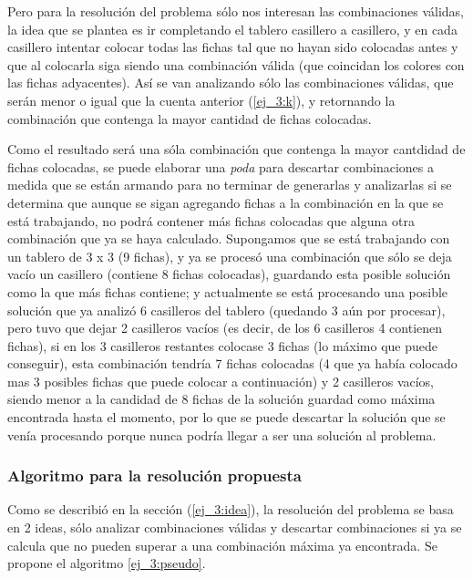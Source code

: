 Pero para la resoluci\'on del problema s\'olo nos interesan las combinaciones v\'alidas, la idea que se plantea es ir completando el tablero casillero a casillero, y en cada casillero intentar colocar todas las fichas tal que no hayan sido colocadas antes y que al colocarla siga siendo una combinaci\'on v\'alida (que coincidan los colores con las fichas adyacentes). As\'i se van analizando s\'olo las combinaciones v\'alidas, que ser\'an menor o igual que la cuenta anterior (\ref{ej_3:k}), y retornando la combinaci\'on que contenga la mayor cantidad de fichas colocadas.

Como el resultado ser\'a una s\'ola combinaci\'on que contenga la mayor cantdidad de fichas colocadas, se puede elaborar una \emph{poda} para descartar combinaciones a medida que se est\'an armando para no terminar de generarlas y analizarlas si se determina que aunque se sigan agregando fichas a la combinaci\'on en la que se est\'a trabajando, no podr\'a contener m\'as fichas colocadas que alguna otra combinaci\'on que ya se haya calculado.
Supongamos que se est\'a trabajando con un tablero de 3 x 3 (9 fichas), y ya se proces\'o una combinaci\'on que s\'olo se deja vac\'io un casillero (contiene 8 fichas colocadas), guardando esta posible soluci\'on como la que m\'as fichas contiene; y actualmente se est\'a procesando una posible soluci\'on que ya analiz\'o 6 casilleros del tablero (quedando 3 a\'un por procesar), pero tuvo que dejar 2 casilleros vac\'ios (es decir, de los 6 casilleros 4 contienen fichas),
si en los 3 casilleros restantes colocase 3 fichas (lo m\'aximo que puede conseguir), esta combinaci\'on tendr\'ia 7 fichas colocadas (4 que ya hab\'ia colocado mas 3 posibles fichas que puede colocar a continuaci\'on) y 2 casilleros vac\'ios, siendo menor a la candidad de 8 fichas de la soluci\'on guardad como m\'axima encontrada hasta el momento, por lo que se puede descartar la soluci\'on que se ven\'ia procesando porque nunca podr\'ia llegar a ser una soluci\'on al problema.

\subsubsection{Algoritmo para la resoluci\'on propuesta} \label{ej_3:algo}

Como se describi\'o en la secci\'on (\ref{ej_3:idea}), la resoluci\'on del problema se basa en 2 ideas, s\'olo analizar combinaciones v\'alidas y descartar combinaciones si ya se calcula que no pueden superar a una combinaci\'on m\'axima ya encontrada.
Se propone el algoritmo \ref{ej_3:pseudo}.


